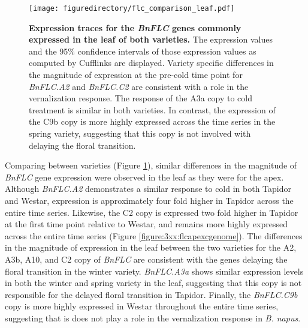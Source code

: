 \documentclass[12pt,]{book}
\begin{document}
\begin{figure}[htbp]
\centering
\texttt{[image: figuredirectory/flc\_comparison\_leaf.pdf]}
\caption{\textbf{Expression traces for the \emph{BnFLC} genes commonly
expressed in the leaf of both varieties.} The expression values and the
95\% confidence intervals of those expression values as computed by
Cufflinks are displayed. Variety specific differences in the magnitude
of expression at the pre-cold time point for \emph{BnFLC.A2} and
\emph{BnFLC.C2} are consistent with a role in the vernalization
response. The response of the A3a copy to cold treatment is similar in
both varieties. In contrast, the expression of the C9b copy is more
highly expressed across the time series in the spring variety,
suggesting that this copy is not involved with delaying the floral
transition.}\label{figure:3xx:flcleafcgenome}
\end{figure}

Comparing between varieties (Figure \ref{figure:3xx:flcleafcgenome}),
similar differences in the magnitude of \emph{BnFLC} gene expression
were observed in the leaf as they were for the apex. Although
\emph{BnFLC.A2} demonstrates a similar response to cold in both Tapidor
and Westar, expression is approximately four fold higher in Tapidor
across the entire time series. Likewise, the C2 copy is expressed two
fold higher in Tapidor at the first time point relative to Westar, and
remains more highly expressed across the entire time series (Figure
\ref{figure:3xx:flcapexcgenome}). The differences in the magnitude of
expression in the leaf between the two varieties for the A2, A3b, A10,
and C2 copy of \emph{BnFLC} are consistent with the genes delaying the
floral transition in the winter variety. \emph{BnFLC.A3a} shows similar
expression levels in both the winter and spring variety in the leaf,
suggesting that this copy is not responsible for the delayed floral
transition in Tapidor. Finally, the \emph{BnFLC.C9b} copy is more highly
expressed in Westar throughout the entire time series, suggesting that
is does not play a role in the vernalization response in \emph{B.
napus}.
\end{document}
